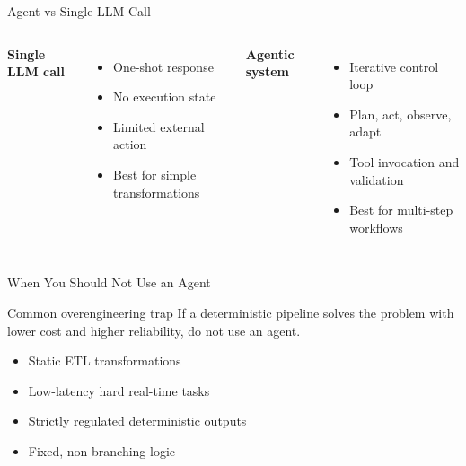 \documentclass[aspectratio=169]{beamer}
\begin{document}
\begin{frame}{Agent vs Single LLM Call}
  \begin{columns}
    \textbf{Single LLM call}
    \begin{itemize}
      \item One-shot response
      \item No execution state
      \item Limited external action
      \item Best for simple transformations
    \end{itemize}

    \textbf{Agentic system}
    \begin{itemize}
      \item Iterative control loop
      \item Plan, act, observe, adapt
      \item Tool invocation and validation
      \item Best for multi-step workflows
    \end{itemize}
  \end{columns}
\end{frame}

\begin{frame}{When You Should Not Use an Agent}
  \begin{alertbox}{Common overengineering trap}
    If a deterministic pipeline solves the problem with lower cost and higher reliability, do not use an agent.
  \end{alertbox}

  \vspace{0.4em}
  \begin{itemize}
    \item Static ETL transformations
    \item Low-latency hard real-time tasks
    \item Strictly regulated deterministic outputs
    \item Fixed, non-branching logic
  \end{itemize}
\end{frame}
\end{document}
